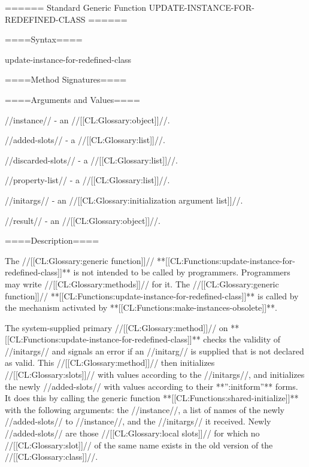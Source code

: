 ====== Standard Generic Function UPDATE-INSTANCE-FOR-REDEFINED-CLASS ======

====Syntax====


\DefgenWithValuesNewline update-instance-for-redefined-class {} {}

====Method Signatures====

 {}

====Arguments and Values====

//instance// - an //[[CL:Glossary:object]]//.

//added-slots// - a //[[CL:Glossary:list]]//.

//discarded-slots// - a //[[CL:Glossary:list]]//.

//property-list// - a //[[CL:Glossary:list]]//.

//initargs// - an //[[CL:Glossary:initialization argument list]]//.

//result// - an //[[CL:Glossary:object]]//.

====Description====

The //[[CL:Glossary:generic function]]// **[[CL:Functions:update-instance-for-redefined-class]]** is not intended to be called by programmers. Programmers may write //[[CL:Glossary:methods]]// for it. The //[[CL:Glossary:generic function]]// **[[CL:Functions:update-instance-for-redefined-class]]** is called by the mechanism activated by **[[CL:Functions:make-instances-obsolete]]**.

The system-supplied primary //[[CL:Glossary:method]]// on **[[CL:Functions:update-instance-for-redefined-class]]** checks the validity of //initargs// and signals an error if an //initarg// is supplied that is not declared as valid. This //[[CL:Glossary:method]]// then initializes //[[CL:Glossary:slots]]// with values according to the //initargs//, and initializes the newly //added-slots// with values according to their **'':initform''** forms. It does this by calling the generic function **[[CL:Functions:shared-initialize]]** with the following arguments: the //instance//, a list of names of the newly //added-slots// to //instance//, and the //initargs// it received. Newly //added-slots// are those //[[CL:Glossary:local slots]]// for which no //[[CL:Glossary:slot]]// of the same name exists in the old version of the //[[CL:Glossary:class]]//.

